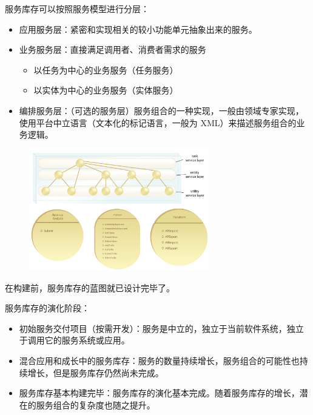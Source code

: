 服务库存可以按照服务模型进行分层：
\begin{itemize}
    \item 应用服务层：紧密和实现相关的较小功能单元抽象出来的服务。
    \item 业务服务层：直接满足调用者、消费者需求的服务
    \vspace{-0.8em}
    \begin{multicols}{2}
        \begin{itemize}
            \item 以任务为中心的业务服务（任务服务）
            \item 以实体为中心的业务服务（实体服务）
        \end{itemize}
    \end{multicols}
    \vspace{-1em}
    \item 编排服务层：（可选的服务层）服务组合的一种实现，一般由领域专家实现，使用平台中立语言（文本化的标记语言，一般为 XML）来描述服务组合的业务逻辑。
\end{itemize}

\begin{figure}[H]
    \vspace{-0.5em}
	\centering
	\includegraphics[width=0.7\textwidth]{images/服务模型.png}
    \vspace{-1em}
\end{figure}

在构建前，服务库存的蓝图就已设计完毕了。

服务库存的演化阶段：
\begin{itemize}
    \item 初始服务交付项目（按需开发）：服务是中立的，独立于当前软件系统，独立于调用它的服务系统或应用。
    \item 混合应用和成长中的服务库存：服务的数量持续增长，服务组合的可能性也持续增长，但是服务库存仍然尚未完成。
    \item 服务库存基本构建完毕：服务库存的演化基本完成。随着服务库存的增长，潜在的服务组合的复杂度也随之提升。
\end{itemize}


